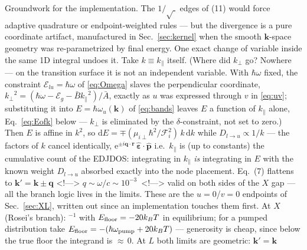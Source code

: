 \documentclass[11pt,a4paper]{article}
\numberwithin{equation}{section}
\begin{document}
Groundwork for the implementation.  The $1/\sqrt{\;}$ edges of (11)
would force adaptive quadrature or endpoint-weighted rules --- but the
divergence is a pure coordinate artifact, manufactured in
Sec.~\ref{sec:kernel} when the smooth $\mathbf k$-space geometry was
re-parametrized by final energy.  One exact change of variable inside
the same 1D integral undoes it.  Take $k\equiv{k_{\parallel}}$ itself.  (Where
did ${k_{\perp}}$ go?  Nowhere --- on the transition surface it is not an
independent variable.  With ${\hbar\omega}$ fixed, the constraint
${\mathcal{E}_{lu}}={\hbar\omega}$ of \eqref{eq:Omega} slaves the perpendicular
coordinate, ${k_{\perp}}^{2}=({\hbar\omega}-{\mathcal{E}_g}-{\bar{B}}{k_{\parallel}}^{2})/{\bar{A}}$, exactly as $u$
was expressed through $v$ in \eqref{eq:uv}; substituting it into
$E=\hbar\omega_u(\mathbf k)$ of \eqref{eq:bands} leaves $E$ a function
of ${k_{\parallel}}$ alone, Eq.~\eqref{eq:Eofk} below --- ${k_{\perp}}$ is
eliminated by the $\delta$-constraint, not set to zero.)  Then $E$ is
affine in $k^2$, so ${\mathrm{d}} E=\mp(\mu_{i\perp}\hbar^2/{\mathcal{F}}_i^2)\,k\,{\mathrm{d}} k$
while ${D_{l\to u}}\propto1/k$ --- the factors of $k$ cancel identically,
${\mathrm{e}}^{\pm i\mathbf q\cdot\mathbf r}\,\hat{\bm{\varepsilon}}\!\cdot\!\hat{\mathbf p}$
i.e.\ ${k_{\parallel}}$ is (up to constants) the cumulative count of the
EDJDOS: integrating in ${k_{\parallel}}$ \emph{is} integrating in $E$ with the
known weight ${D_{l\to u}}$ absorbed exactly into the node placement.
Eq.~(7) flattens to
$\mathbf k'=\mathbf k\pm\mathbf q$
<!--\label{eq:k12}-->
$q\sim\omega/c\sim10^{-3}\,$
<!--\label{eq:Eofk}-->
valid on both sides of the $X$ gap --- all the branch logic lives in
the limits.  These are the $u=0$/$v=0$ endpoints of
Sec.~\ref{sec:XL}, written out since an implementation touches them
first.  At $X$ (Rosei's branch):
$^{-1}$
with $E_{\rm floor}=-20{k_B} T$ in equilibrium; for a pumped
distribution take $E_{\rm floor}=-(\hbar\omega_{\rm pump}+20{k_B} T)$
--- generosity is cheap, since below the true floor the integrand is
${\approx}\,0$.  At $L$ both limits are geometric:
$\mathbf k'=\mathbf k$
\end{document}

